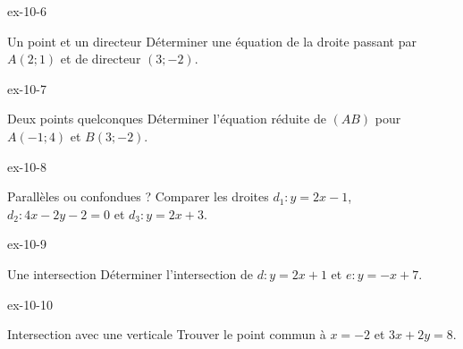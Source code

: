 \clearpage{}
\begin{blocLivre}{ex-10-6}
\begin{exercice}[2]{Un point et un directeur}
Déterminer une équation de la droite passant par $A(2;1)$ et de directeur $(3;-2)$.
\label{fig-ex-10-6}
\end{exercice}
\end{blocLivre}
\begin{blocLivre}{ex-10-7}
\begin{exercice}[2]{Deux points quelconques}
Déterminer l’équation réduite de $(AB)$ pour $A(-1;4)$ et $B(3;-2)$.
\label{fig-ex-10-7}
\end{exercice}
\end{blocLivre}
\begin{blocLivre}{ex-10-8}
\begin{exercice}[2]{Parallèles ou confondues ?}
Comparer les droites $d_1:y=2x-1$, $d_2:4x-2y-2=0$ et $d_3:y=2x+3$.
\label{fig-ex-10-8}
\end{exercice}
\end{blocLivre}
\begin{blocLivre}{ex-10-9}
\begin{exercice}[2]{Une intersection}
Déterminer l’intersection de $d:y=2x+1$ et $e:y=-x+7$.
\label{fig-ex-10-9}
\end{exercice}
\end{blocLivre}
\begin{blocLivre}{ex-10-10}
\begin{exercice}[2]{Intersection avec une verticale}
Trouver le point commun à $x=-2$ et $3x+2y=8$.
\label{fig-ex-10-10}
\end{exercice}
\end{blocLivre}


